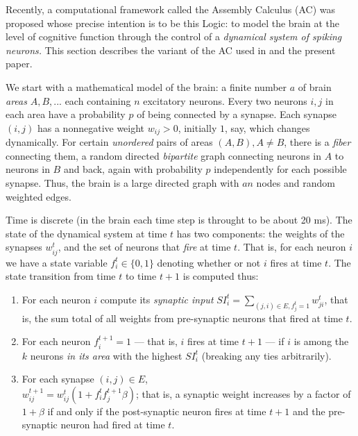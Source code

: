 \documentclass[11pt]{article}
\begin{document}
Recently, a computational framework called the Assembly Calculus (AC) was proposed whose precise intention is to be this Logic: to model the brain at the level of cognitive function through the control of a {\em dynamical system of spiking neurons.} This section describes the variant of the AC used in \citet{Parser} and the present paper. 

We start with a mathematical model of the brain: a finite number $a$ of brain {\em areas} $A, B,...$ each containing $n$ excitatory neurons.  Every two neurons $i,j$ in each area have a probability $p$ of being connected by a synapse.  Each synapse $(i,j)$ has a nonnegative weight $w_{ij}>0$, initially $1$, say, which changes dynamically.  For certain {\em unordered} pairs of areas $(A,B), A\neq B$, there is a {\em fiber} connecting them, a random directed {\em bipartite} graph connecting neurons in $A$ to neurons in $B$ and back, again with probability $p$ independently for each possible synapse. Thus, the brain is a large directed graph with $an$ nodes and random weighted edges.  

Time is discrete (in the brain each time step is throught to be about 20 ms). The state of the dynamical system at time $t$ has two components: the weights of the synapses $w_{ij}^t$, and the set of neurons that {\em fire} at time $t$.  That is, for each neuron $i$ we have a state variable $f_i^t\in \{0,1\}$ denoting whether or not $i$ {fires} at time $t$.  The state transition from time $t$ to time $t+1$ is computed thus:
\begin{enumerate}
    \item For each neuron $i$ compute its {\em synaptic input} $SI_{i}^t=\sum_{(j,i)\in E, f_j^t=1}w_{ji}^t$, that is, the sum total of all weights from pre-synaptic neurons that fired at time $t$.
    \item For each neuron $f_i^{t+1}=1$ --- that is, $i$ fires at time $t+1$ --- if $i$ is among the $k$ neurons {\em in its area} with the highest $SI_i^t$ (breaking any ties arbitrarily).
    \item For each synapse $(i,j)\in E$,\\
    $w_{ij}^{t+1}=w_{ij}^t(1+ f^t_i f^{t+1}_j \beta)$; that is, a synaptic weight increases by a factor of $1+\beta$ if and only if the post-synaptic neuron fires at time $t+1$ and the pre-synaptic neuron had fired at time $t$.
\end{enumerate}
\end{document}
